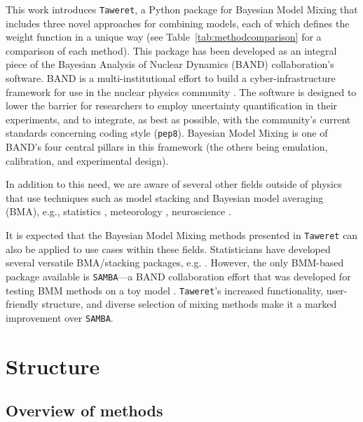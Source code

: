 \documentclass[10pt, preprint,aps,prc,floatfix,
tightenlines,
nofootinbib,superscriptaddress]{revtex4-2}
\begin{document}
This work introduces \texttt{Taweret}, a Python package for Bayesian Model Mixing that includes three novel approaches for combining models, each of which defines the weight function in a unique way (see Table~\ref{tab:methodcomparison} for a comparison of each method). This package has been developed as an integral piece of the Bayesian Analysis of Nuclear Dynamics (BAND) collaboration's software. BAND is a multi-institutional effort to build a cyber-infrastructure framework for use in the nuclear physics community \cite{Phillips:2020dmw, bandframework}. The software is designed to lower the barrier for researchers to employ uncertainty quantification in their experiments, and to integrate, as best as possible, with the community's current standards concerning coding style (\texttt{pep8}). Bayesian Model Mixing is one of BAND's four central pillars in this framework (the others being emulation, calibration, and experimental design).

In addition to this need, we are aware of several other fields outside of physics that use techniques such as model stacking and Bayesian model averaging (BMA), e.g., statistics \cite{Yao2018, Yao2022}, meteorology \cite{Sloughter2007}, neuroscience \cite{FitzGerald2014}.

It is expected that the Bayesian Model Mixing methods presented in \texttt{Taweret} can also be applied to use cases within these fields. 
Statisticians have developed several versatile BMA/stacking packages, e.g. \cite{loo, BMA_R}. However, the only BMM-based package available is \texttt{SAMBA}---a BAND collaboration effort that was developed for testing BMM methods on a toy model \cite{Semposki:2022gcp}. \texttt{Taweret}'s increased functionality, user-friendly structure, and diverse selection of mixing methods make it a marked improvement over \texttt{SAMBA}. 

\section{Structure}

\subsection{Overview of methods}
\end{document}
